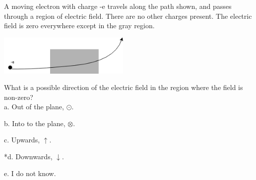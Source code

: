 
A moving electron with charge -e travels along the path shown, and passes through a region of electric field. There are no other charges present. The electric field is zero everywhere except in the gray region.

\includegraphics[width=2.5in]{../../Images/FieldsEBHQ14.png}

What is a possible direction of the electric field in the region where the field is non-zero?\\

a. Out of the plane, $\odot$.

b. Into to the plane, $\otimes$.

c. Upwards, $\uparrow$.

*d. Downwards, $\downarrow$.

e. I do not know.\\
